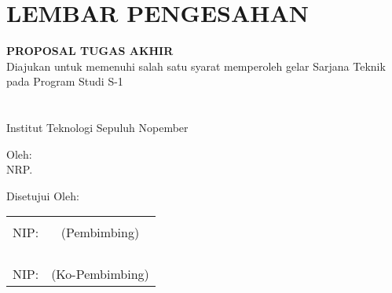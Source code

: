 \chapter*{LEMBAR PENGESAHAN}

\thispagestyle{empty}

\begin{center}
  \textbf{\tatitle{}}
\end{center}

\begingroup
\small

\begin{center}
  \textbf{PROPOSAL TUGAS AKHIR} \\
  Diajukan untuk memenuhi salah satu syarat memperoleh gelar
  Sarjana Teknik pada
  Program Studi S-1 \studyprogram{} \\
  \department{} \\
  \faculty{} \\
  Institut Teknologi Sepuluh Nopember
\end{center}

\begin{center}
  Oleh: \textbf{\name{}} \\
  NRP. \nrp{}
\end{center}

\begin{center}
  Disetujui Oleh:
\end{center}

\vspace{10ex}

\begingroup
\setlength{\tabcolsep}{0pt}

\noindent
\begin{tabularx}{\textwidth}{X c}
  \advisor{}                    &                 \\
  NIP: \advisornip{}            & (Pembimbing)    \\
                                &                 \\
                                &                 \\
                                &                 \\
  \coadvisor{}                  &                 \\
  NIP: \coadvisornip{}          & (Ko-Pembimbing) \\
\end{tabularx}
\endgroup

